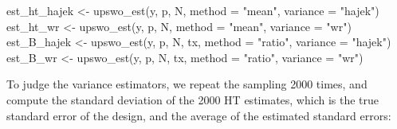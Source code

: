 \documentclass[
  letterpaper,
  DIV=11,
  numbers=noendperiod]{scrreprt}
\newenvironment{Shaded}{\begin{snugshade}}{\end{snugshade}}
\newcommand{\AttributeTok}[1]{\textcolor[rgb]{0.40,0.45,0.13}{#1}}
\newcommand{\FunctionTok}[1]{\textcolor[rgb]{0.28,0.35,0.67}{#1}}
\newcommand{\NormalTok}[1]{\textcolor[rgb]{0.00,0.23,0.31}{#1}}
\newcommand{\OtherTok}[1]{\textcolor[rgb]{0.00,0.23,0.31}{#1}}
\newcommand{\StringTok}[1]{\textcolor[rgb]{0.13,0.47,0.30}{#1}}
\renewcommand{\[}{\begin{equation}}
\renewcommand{\]}{\end{equation}}
\begin{document}
\begin{Shaded}
\begin{Highlighting}[]
\NormalTok{est\_ht\_hajek }\OtherTok{\textless{}{-}} \FunctionTok{upswo\_est}\NormalTok{(y, p, N, }\AttributeTok{method =} \StringTok{"mean"}\NormalTok{, }\AttributeTok{variance =} \StringTok{"hajek"}\NormalTok{)}
\NormalTok{est\_ht\_wr    }\OtherTok{\textless{}{-}} \FunctionTok{upswo\_est}\NormalTok{(y, p, N, }\AttributeTok{method =} \StringTok{"mean"}\NormalTok{, }\AttributeTok{variance =} \StringTok{"wr"}\NormalTok{)}
\NormalTok{est\_B\_hajek }\OtherTok{\textless{}{-}} \FunctionTok{upswo\_est}\NormalTok{(y, p, N, tx, }\AttributeTok{method =} \StringTok{"ratio"}\NormalTok{, }\AttributeTok{variance =} \StringTok{"hajek"}\NormalTok{)}
\NormalTok{est\_B\_wr    }\OtherTok{\textless{}{-}} \FunctionTok{upswo\_est}\NormalTok{(y, p, N, tx, }\AttributeTok{method =} \StringTok{"ratio"}\NormalTok{, }\AttributeTok{variance =} \StringTok{"wr"}\NormalTok{)}
\end{Highlighting}
\end{Shaded}

To judge the variance estimators, we repeat the sampling 2000 times, and
compute the standard deviation of the 2000 HT estimates, which is the
true standard error of the design, and the average of the estimated
standard errors:
\end{document}
